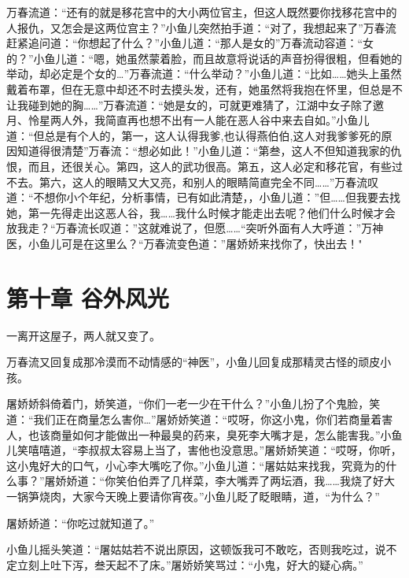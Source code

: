 \documentclass[12pt,oneside]{book}
\begin{document}
万春流道：``还有的就是移花宫中的大小两位官主，但这人既然要你找移花宫中的人报仇，又怎会是这两位宫主？''小鱼儿突然拍手道：``对了，我想起来了''万春流赶紧追问道：``你想起了什么？''小鱼儿道：``那人是女的''万春流动容道：``女的？''小鱼儿道：``嗯，她虽然蒙着脸，而且故意将说话的声音扮得很粗，但看她的举动，却必定是个女的\ldots{}''万春流道：``什么举动？''小鱼儿道：``比如\ldots\ldots 她头上虽然戴着布罩，但在无意中却还不时去摸头发，还有，她虽然将我抱在怀里，但总是不让我碰到她的胸\ldots\ldots{}''万春流道：``她是女的，可就更难猜了，江湖中女子除了邀月、怜星两人外，我简直再也想不出有一人能在恶人谷中来去自如。''小鱼儿道：``但总是有个人的，第一，这人认得我爹,也认得燕伯伯,这人对我爹爹死的原因知道得很清楚''万春流：``想必如此！''小鱼儿道：``第叁，这人不但知道我家的仇恨，而且，还很关心。第四，这人的武功很高。第五，这人必定和移花官，有些过不去。第六，这人的眼睛又大又亮，和别人的眼睛简直完全不同\ldots\ldots{}''万春流叹道：``不想你小个年纪，分析事情，已有如此清楚，，小鱼儿道：''但\ldots\ldots 但我要去找她，第一先得走出这恶人谷，我\ldots\ldots 我什么时候才能走出去呢？他们什么时候才会放我走？``万春流长叹道：''这就难说了，但愿\ldots\ldots{}``突听外面有人大呼道：''万神医，小鱼儿可是在这里么？``万春流变色道：''屠娇娇来找你了，快出去！"

\hypertarget{ux7b2cux5341ux7ae0-ux8c37ux5916ux98ceux5149}{%
\chapter{第十章
谷外风光}\label{ux7b2cux5341ux7ae0-ux8c37ux5916ux98ceux5149}}

一离开这屋子，两人就又变了。

万春流又回复成那冷漠而不动情感的``神医''，小鱼儿回复成那精灵古怪的顽皮小孩。

屠娇娇斜倚着门，娇笑道，``你们一老一少在干什么？''小鱼儿扮了个鬼脸，笑道：``我们正在商量怎么害你\ldots{}''屠娇娇笑道：``哎呀，你这小鬼，你们若商量着害人，也该商量如何才能做出一种最臭的药来，臭死李大嘴才是，怎么能害我。''小鱼儿笑嘻嘻道，``李叔叔太容易上当了，害他也没意思。''屠娇娇笑道：``哎呀，你听，这小鬼好大的口气，小心李大嘴吃了你。''小鱼儿道：``屠姑姑来找我，究竟为的什么事？''屠娇娇道：``你笑伯伯弄了几样菜，李大嘴弄了两坛酒，我\ldots\ldots 我烧了好大一锅笋烧肉，大家今天晚上要请你宵夜。''小鱼儿眨了眨眼睛，道，``为什么？''

屠娇娇道：``你吃过就知道了。''

小鱼儿摇头笑道：``屠姑姑若不说出原因，这顿饭我可不敢吃，否则我吃过，说不定立刻上吐下泻，叁天起不了床。''屠娇娇笑骂过：``小鬼，好大的疑心病。''
\end{document}
